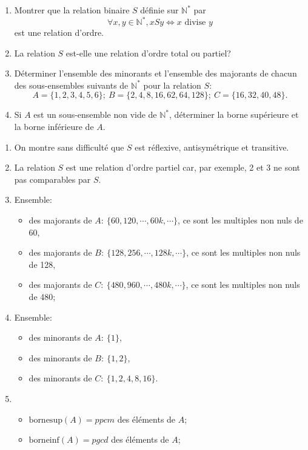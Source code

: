 \begin{exercise}[from=Devoir SR MPI 2010]
    \begin{enumerate}
        \item Montrer que la relation binaire $S$ définie sur $\mathbb{N}^*$ par
        \begin{equation*}
            \forall x,y \in \mathbb{N}^*, xSy \Longleftrightarrow x \text{ divise } y
        \end{equation*}
        est une relation d'ordre.
        \item La relation $S$ est-elle une relation d'ordre total ou partiel?
        \item Déterminer l'ensemble des minorants et l'ensemble  des majorants de chacun des sous-ensembles suivants de $\mathbb{N}^*$ pour la relation $S$:
        \begin{equation*}
            A=\{1,2,3,4,5,6\}; \ B=\{2,4,8,16,62,64,128\}; \ C=\{16,32,40,48\}.
        \end{equation*}
        \item Si $A$ est un sous-ensemble non vide de $\mathbb{N}^*$, déterminer la borne supérieure et la borne inférieure de $A$.
    \end{enumerate}

    \cor
    \begin{enumerate}
        \item On montre sans difficulté que $S$ est réflexive, antisymétrique et transitive.
        \item La relation $S$ est une relation d'ordre partiel car, par exemple, 2 et 3 ne sont pas comparables par $S$.
        \item Ensemble: \begin{itemize}
            \item des majorants de $A:\ \{60, 120, \cdots, 60k, \cdots\}$, ce sont les multiples non nuls de 60,
            \item des majorants de $B:\ \{128, 256, \cdots, 128k, \cdots\}$, ce sont les multiples non nuls de 128,
            \item des majorants de $C:\ \{480, 960, \cdots, 480k, \cdots\}$, ce sont les multiples non nuls de 480;
        \end{itemize}
        \item Ensemble: \begin{itemize}
            \item des minorants de $A:\ \{1\}$,
            \item des minorants de $B:\ \{1, 2\}$,
            \item des minorants de $C:\ \{1, 2, 4, 8, 16\}$.
        \end{itemize}
        \item \begin{itemize}
            \item  $\text{bornesup}(A)=ppcm$ des éléments de $A$;
            \item  $\text{borneinf}(A)=pgcd$ des éléments de $A$;
        \end{itemize}
    \end{enumerate}
\end{exercise}

